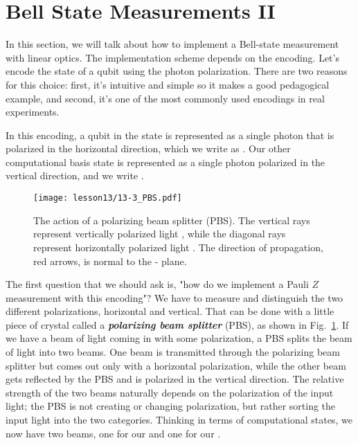 \section{Bell State Measurements II}
\label{sec:13-3_Bell_state_measurement_2}

In this section, we will talk about how to implement a Bell-state measurement with linear optics. The implementation scheme depends on the encoding. Let's encode the state of a qubit using the photon polarization. There are two reasons for this choice: first, it's intuitive and simple so it makes a good pedagogical example, and second, it's one of the most commonly used encodings in real experiments.

In this encoding, a qubit in the state  is represented as a single photon that is polarized in the horizontal direction, which we write as .
Our other computational basis state  is represented as a single photon polarized in the vertical direction, and we write .

\begin{figure}[t]
    \centering
    \texttt{[image: lesson13/13-3\_PBS.pdf]}
    \caption[A polarizing beam splitter (PBS)]{The action of a polarizing beam splitter (PBS).  The vertical rays represent vertically polarized light , while the diagonal rays represent horizontally polarized light .  The direction of propagation, red arrows, is normal to the - plane.}
    \label{fig:13-PBS}
\end{figure}

The first question that we should ask is, "how do we implement a Pauli $Z$ measurement with this encoding"? We have to measure and distinguish the two different polarizations, horizontal and vertical. That can be done with a little piece of crystal called a \textit{\textbf{polarizing beam splitter}} (PBS), as shown in Fig.~\ref{fig:13-PBS}. If we have a beam of light coming in with some polarization, a PBS splits the beam of light into two beams. One beam is transmitted through the polarizing beam splitter but comes out only with a horizontal polarization, while the other beam gets reflected by the PBS and is polarized in the vertical direction. The relative strength of the two beams naturally depends on the polarization of the input light; the PBS is not creating or changing polarization, but rather sorting the input light into the two categories.
Thinking in terms of computational states, we now have two beams, one for our  and one for our .

